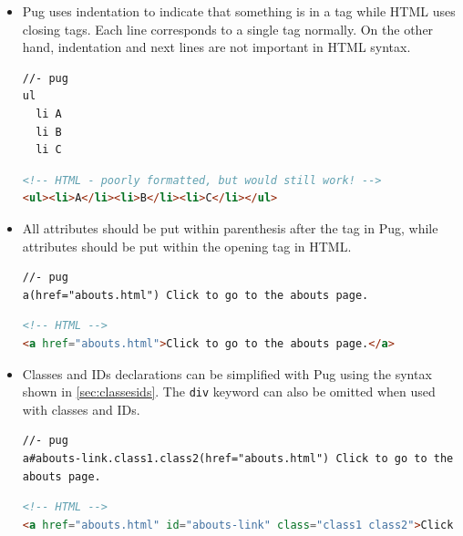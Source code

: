 \begin{itemize}
\item Pug uses indentation to indicate that something is in a tag while HTML uses closing tags. Each line corresponds to a single tag normally. On the other hand, indentation and next lines are not important in HTML syntax.
\vspace{6mm}

\begin{lstlisting}[language=pug]
//- pug
ul
  li A
  li B
  li C
\end{lstlisting}

\begin{lstlisting}[language=html]
<!-- HTML - poorly formatted, but would still work! -->
<ul><li>A</li><li>B</li><li>C</li></ul>
\end{lstlisting}

\item All attributes should be put within parenthesis after the tag in Pug, while attributes should be put within the opening tag in HTML.
\vspace{6mm}

\begin{lstlisting}[language=pug]
//- pug
a(href="abouts.html") Click to go to the abouts page.
\end{lstlisting}

\begin{lstlisting}[language=html]
<!-- HTML -->
<a href="abouts.html">Click to go to the abouts page.</a>
\end{lstlisting}

\item Classes and IDs declarations can be simplified with Pug using the syntax shown in \cref{sec:classesids}. The \texttt{div} keyword can also be omitted when used with classes and IDs.
\vspace{6mm}

\begin{lstlisting}[language=pug]
//- pug
a#abouts-link.class1.class2(href="abouts.html") Click to go to the abouts page.
\end{lstlisting}

\begin{lstlisting}[language=html]
<!-- HTML -->
<a href="abouts.html" id="abouts-link" class="class1 class2">Click to go to the abouts page.</a>
\end{lstlisting}

\end{itemize}